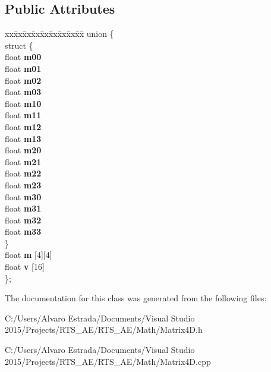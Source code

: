 \subsection*{Public Attributes}
\begin{DoxyCompactItemize}
\item 
\begin{tabbing}
xx\=xx\=xx\=xx\=xx\=xx\=xx\=xx\=xx\=\kill
union \{\\
\>struct \{\\
\>\>float {\bfseries m00}\\
\>\>float {\bfseries m01}\\
\>\>float {\bfseries m02}\\
\>\>float {\bfseries m03}\\
\>\>float {\bfseries m10}\\
\>\>float {\bfseries m11}\\
\>\>float {\bfseries m12}\\
\>\>float {\bfseries m13}\\
\>\>float {\bfseries m20}\\
\>\>float {\bfseries m21}\\
\>\>float {\bfseries m22}\\
\>\>float {\bfseries m23}\\
\>\>float {\bfseries m30}\\
\>\>float {\bfseries m31}\\
\>\>float {\bfseries m32}\\
\>\>float {\bfseries m33}\\
\>\} \hypertarget{union_c_matrix4_d_1_1_0D4_a72cef536dcdc14b9eedc055db701f176}{}\label{union_c_matrix4_d_1_1_0D4_a72cef536dcdc14b9eedc055db701f176}
\\
\>float {\bfseries m} \mbox{[}4\mbox{]}\mbox{[}4\mbox{]}\\
\>float {\bfseries v} \mbox{[}16\mbox{]}\\
\}; \hypertarget{class_c_matrix4_d_aa4668f8a2690d6ca5643867dcf1e2f64}{}\label{class_c_matrix4_d_aa4668f8a2690d6ca5643867dcf1e2f64}
\\

\end{tabbing}\end{DoxyCompactItemize}


The documentation for this class was generated from the following files\+:\begin{DoxyCompactItemize}
\item 
C\+:/\+Users/\+Alvaro Estrada/\+Documents/\+Visual Studio 2015/\+Projects/\+R\+T\+S\+\_\+\+A\+E/\+R\+T\+S\+\_\+\+A\+E/\+Math/Matrix4\+D.\+h\item 
C\+:/\+Users/\+Alvaro Estrada/\+Documents/\+Visual Studio 2015/\+Projects/\+R\+T\+S\+\_\+\+A\+E/\+R\+T\+S\+\_\+\+A\+E/\+Math/Matrix4\+D.\+cpp\end{DoxyCompactItemize}
